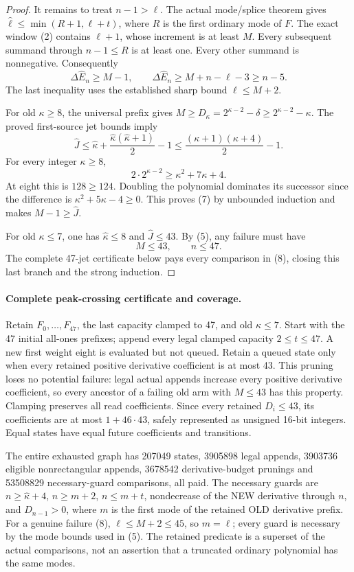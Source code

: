 \begin{proof}
It remains to treat $n-1>\ell$. The actual mode/splice theorem gives
$\widehat\ell\le\min(R+1,\ell+t)$, where $R$ is the first ordinary
mode of $F$. The exact window (2) contains $\ell+1$, whose increment
is at least $M$. Every subsequent summand through $n-1\le R$
is at least one. Every other summand is nonnegative. Consequently
\[
 \Delta\widehat E_n\ge M-1,\qquad
 \Delta\widehat E_n\ge M+n-\ell-3\ge n-5.                      \tag{5}
\]
The last inequality uses the established sharp bound $\ell\le M+2$.

For old $\kappa\ge8$, the universal prefix gives
$M\ge D_\kappa=2^{\kappa-2}-\delta\ge2^{\kappa-2}-\kappa$.
The proved first-source jet bounds imply
\[
 \widehat J\le\widehat\kappa+
       \frac{\widehat\kappa(\widehat\kappa+1)}2-1
       \le\frac{(\kappa+1)(\kappa+4)}2-1.                     \tag{6}
\]
For every integer $\kappa\ge8$,
\[
       2\cdot2^{\kappa-2}\ge\kappa^2+7\kappa+4.              \tag{7}
\]
At eight this is $128\ge124$. Doubling the polynomial dominates
its successor since the difference is $\kappa^2+5\kappa-4\ge0$.
This proves (7) by unbounded induction and makes $M-1\ge\widehat J$.

For old $\kappa\le7$, one has $\widehat\kappa\le8$ and
$\widehat J\le43$. By (5), any failure must have
\[
                             M\le43,\qquad n\le47.           \tag{8}
\]
The complete 47-jet certificate below pays every comparison in (8),
closing this last branch and the strong induction.
\end{proof}

\paragraph{Complete peak-crossing certificate and coverage.}
Retain $F_0,\ldots,F_{47}$, the last capacity clamped to 47, and
old $\kappa\le7$. Start with the 47 initial all-ones prefixes;
append every legal clamped capacity $2\le t\le47$. A new first
weight eight is evaluated but not queued. Retain a queued state only
when every retained positive derivative coefficient is at most 43.
This pruning loses no potential failure: legal actual appends increase
every positive derivative coefficient, so every ancestor of a failing
old arm with $M\le43$ has this property. Clamping preserves all
read coefficients. Since every retained $D_i\le43$, its coefficients
are at most $1+46\cdot43$, safely represented as unsigned 16-bit
integers. Equal states have equal future coefficients and transitions.

The entire exhausted graph has 207049 states, 3905898 legal appends,
3903736 eligible nonrectangular appends, 3678542 derivative-budget
prunings and 53508829 necessary-guard comparisons, all paid.
The necessary guards are $n\ge\widehat\kappa+4$, $n\ge m+2$,
$n\le m+t$, nondecrease of the NEW derivative through $n$, and
$D_{n-1}>0$, where $m$ is the first mode of the retained OLD
derivative prefix. For a genuine failure (8), $\ell\le M+2\le45$,
so $m=\ell$; every guard is necessary by the mode bounds used in (5).
The retained predicate is a superset of the actual comparisons, not
an assertion that a truncated ordinary polynomial has the same modes.

